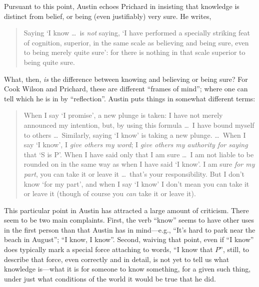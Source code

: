 Pursuant to this point, Austin echoes Prichard in insisting that knowledge is distinct from belief, or being (even justifiably) very sure. He writes,
\begin{quote}
	Saying `I know \ldots\ is \emph{not} saying, `I have performed a specially striking feat of cognition, superior, in the same scale as believing and being sure, even to being merely quite sure': for there is nothing in that scale superior to being quite sure. \citep[171]{Austin:1946ao}
\end{quote}
What, then, \emph{is} the difference between knowing and believing or being sure? For Cook Wilson and Prichard, these are different ``frames of mind''; where one can tell which he is in by ``reflection''. Austin puts things in somewhat different terms:
\begin{quotation}
	\noindent When I say `I promise', a new plunge is taken: I have not merely announced my intention, but, by using this formula \ldots\ I have bound myself to others \ldots\ Similarly, saying `I know' is taking a new plunge. \ldots\ When I say `I know', I \emph{give others my word}; I \emph{give others my authority for saying} that `S is P'.
	When I have said only that I am sure \ldots\ I am not liable to be rounded on in the same way as when I have said `I know'. I am sure \emph{for my part}, you can take it or leave it \ldots\ that’s your responsibility. But I don’t know `for my part', and when I say `I know' I don't mean you can take it or leave it (though of course you \emph{can} take it or leave it). \citep[171]{Austin:1946ao}
\end{quotation}
This particular point in Austin has attracted a large amount of criticism. There seem to be two main complaints. First, the verb ``know'' seems to have other uses in the first person than that Austin has in mind---e.g., ``It's hard to park near the beach in August''; ``I know, I know''. Second, waiving that point, even if ``I know'' does typically mark a special force attaching to words, ``I know that \( P \)'', still, to describe that force, even correctly and in detail, is not yet to tell us what knowledge is---what it is for someone to know something, for a given such thing, under just what conditions of the world it would be true that he did.

